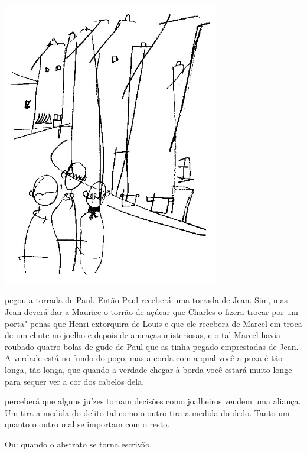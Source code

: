 \begin{vplace}[.50]
\begin{center}
\includegraphics[width=95mm]{./imgs/Image_9.jpg}
\end{center}
\end{vplace}

\pagebreak
\thispagestyle{empty}

\movetooddpage

 pegou a torrada de Paul. Então Paul receberá uma torrada de Jean.
Sim, mas Jean deverá dar a Maurice o torrão de açúcar que Charles o
fizera trocar por um porta"-penas que Henri extorquira de Louis e que ele
recebera de Marcel em troca de um chute no joelho e depois de ameaças
misteriosas, e o tal Marcel havia roubado quatro bolas de gude de Paul
que as tinha pegado emprestadas de Jean. A verdade está no fundo do
poço, mas a corda com a qual você a puxa é tão longa, tão longa, que
quando a verdade chegar à borda você estará muito longe para sequer ver
a cor dos cabelos dela.



 perceberá que alguns juízes tomam decisões como joalheiros vendem
uma aliança. Um tira a medida do delito tal como o outro tira a medida
do dedo. Tanto um quanto o outro mal se importam com o resto.



 Ou: quando o abstrato se torna escrivão.


